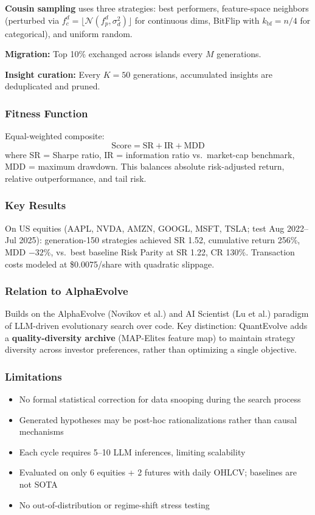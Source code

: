 \documentclass[11pt,a4paper]{article}
\begin{document}
\textbf{Cousin sampling} uses three strategies: best performers, feature-space neighbors (perturbed via $f_c^d = \lfloor \mathcal{N}(f_p^d, \sigma_d^2) \rfloor$ for continuous dims, BitFlip with $k_{\text{bf}} = n/4$ for categorical), and uniform random.

\textbf{Migration:} Top 10\% exchanged across islands every $M$ generations.

\textbf{Insight curation:} Every $K = 50$ generations, accumulated insights are deduplicated and pruned.

\subsubsection{Fitness Function}

Equal-weighted composite:
\begin{equation}
\text{Score} = \text{SR} + \text{IR} + \text{MDD}
\end{equation}
where SR = Sharpe ratio, IR = information ratio vs.\ market-cap benchmark, MDD = maximum drawdown. This balances absolute risk-adjusted return, relative outperformance, and tail risk.

\subsubsection{Key Results}

On US equities (AAPL, NVDA, AMZN, GOOGL, MSFT, TSLA; test Aug 2022--Jul 2025): generation-150 strategies achieved SR 1.52, cumulative return 256\%, MDD $-32\%$, vs.\ best baseline Risk Parity at SR 1.22, CR 130\%. Transaction costs modeled at \$0.0075/share with quadratic slippage.

\subsubsection{Relation to AlphaEvolve}

Builds on the AlphaEvolve (Novikov et al.) and AI Scientist (Lu et al.) paradigm of LLM-driven evolutionary search over code. Key distinction: QuantEvolve adds a \textbf{quality-diversity archive} (MAP-Elites feature map) to maintain strategy diversity across investor preferences, rather than optimizing a single objective.

\subsubsection{Limitations}

\begin{itemize}
    \item No formal statistical correction for data snooping during the search process
    \item Generated hypotheses may be post-hoc rationalizations rather than causal mechanisms
    \item Each cycle requires 5--10 LLM inferences, limiting scalability
    \item Evaluated on only 6 equities + 2 futures with daily OHLCV; baselines are not SOTA
    \item No out-of-distribution or regime-shift stress testing
\end{itemize}
\end{document}

